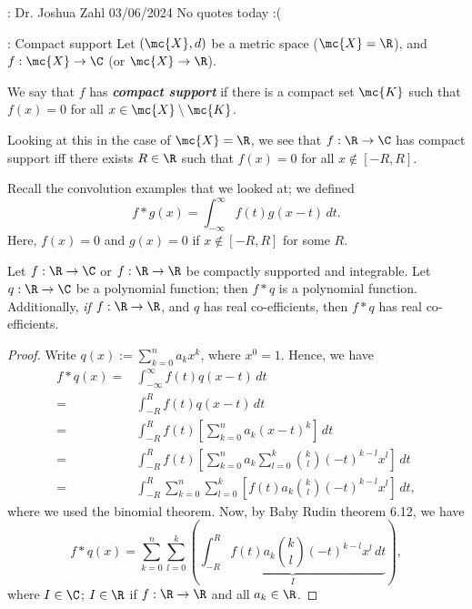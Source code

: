 \begin{nquote}{: Dr. Joshua Zahl 03/06/2024}
    No quotes today :(
\end{nquote}

\begin{ndef}{: Compact support}
    Let \((\mc{X},d)\) be a metric space (\(\mc{X}=\R\)), and \(f:\mc{X}\to\C\) (or \(\mc{X}\to\R\)). 

    \medskip

    We say that \(f\) has \emph{\textbf{compact support}} if there is a compact set \(\mc{K}\) such that \(f(x)=0\) for all \(x\in\mc{X}\setminus\mc{K}\).
\end{ndef}

\begin{example}
    Looking at this in the case of \(\mc{X}=\R\), we see that \(f:\R\to\C\)  has compact support iff there exists \(R\in\R\) such that \(f(x)=0\) for all \(x\notin[-R,R]\).
\end{example}

\begin{example}
    Recall the convolution examples that we looked at; we defined 
    \begin{equation*} 
        f\ast g(x)=\int_{-\infty}^{\infty} f(t)g(x-t) \, dt.
    \end{equation*}
    Here, \(f(x)=0\) and \(g(x)=0\) if \(x\notin [-R,R]\) for some \(R\).
\end{example}

\begin{nlemma}{}
    Let \(f:\R\to\C\) or \(f:\R\to\R\) be compactly supported and integrable. Let \(q:\R\to\C\) be a polynomial function; then \(f\ast q\) is a polynomial function. Additionally, \emph{if} \(f:\R\to\R\), and \(q\) has real co-efficients, then \(f\ast q\) has real co-efficients.
\end{nlemma}
\begin{proof}
    Write \(q(x):=\displaystyle\sum_{k=0}^n a_kx^k\), where \(x^0=1\). Hence, we have 
    \begin{align*} 
        f\ast q(x)=&\int_{-\infty}^{\infty} f(t)q(x-t) \, dt\\
                  =&\int_{-R}^{R} f(t)q(x-t) \, dt\\
                  =&\int_{-R}^{R} f(t)\left[\sum_{k=0}^n a_k(x-t)^k\right] \, dt\\
                  =&\int_{-R}^{R} f(t)\left[\sum_{k=0}^n a_k\sum_{l=0}^{k}\binom{k}{l}(-t)^{k-l}x^l\right] \, dt\\
                  =&\int_{-R}^{R}\sum_{k=0}^n \sum_{l=0}^{k}\left[f(t)a_k\binom{k}{l}(-t)^{k-l}x^l\right]\, dt,
    \end{align*}
    where we used the binomial theorem. Now, by Baby Rudin theorem 6.12, we have 
    \begin{equation*} 
        f\ast q(x)=\sum_{k=0}^n \sum_{l=0}^{k}\left(\underbrace{\int_{-R}^{R}f(t)a_k\binom{k}{l}(-t)^{k-l}x^l \, dt}_{I}\right),
    \end{equation*}
    where \(I\in\C\); \(I\in\R\) if \(f:\R\to\R\) and all \(a_k\in\R\).
\end{proof}

